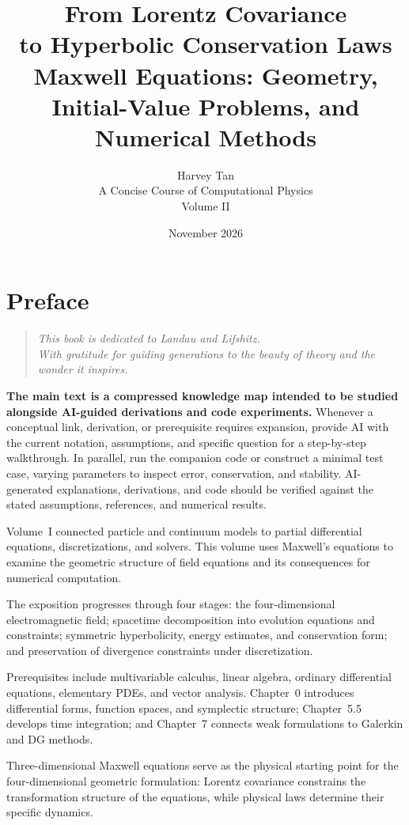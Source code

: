 \documentclass[11pt,openany]{book}
\title{From Lorentz Covariance\\to Hyperbolic Conservation Laws\\[0.6em]\large Maxwell Equations: Geometry, Initial-Value Problems, and Numerical Methods}
\author{Harvey Tan\\[0.6em]\large A Concise Course of Computational Physics\\Volume II}
\date{November 2026}
\numberwithin{equation}{chapter}
\theoremstyle{definition}
\theoremstyle{remark}
\begin{document}
\frontmatter
\maketitle
\chapter*{Preface}
\begin{quote}
\itshape
This book is dedicated to Landau and Lifshitz.\\
With gratitude for guiding generations to the beauty of theory and the wonder it inspires.
\end{quote}
\begin{tcolorbox}[colback=red!3,colframe=red!65!black,title={Study Guide: AI Explanations and Code Experiments},fonttitle=\bfseries,boxrule=0.8pt,arc=1mm,breakable]
\textbf{The main text is a compressed knowledge map intended to be studied alongside AI-guided derivations and code experiments.}
Whenever a conceptual link, derivation, or prerequisite requires expansion,
provide AI with the current notation, assumptions, and specific question for a step-by-step walkthrough.
In parallel, run the companion code or construct a minimal test case, varying parameters to inspect error, conservation, and stability.
AI-generated explanations, derivations, and code should be verified against the stated assumptions, references, and numerical results.
\end{tcolorbox}
Volume~I connected particle and continuum models to partial differential equations, discretizations, and solvers. This volume uses Maxwell's equations to examine the geometric structure of field equations and its consequences for numerical computation.

The exposition progresses through four stages: the four-dimensional electromagnetic field; spacetime decomposition into evolution equations and constraints; symmetric hyperbolicity, energy estimates, and conservation form; and preservation of divergence constraints under discretization.

Prerequisites include multivariable calculus, linear algebra, ordinary differential equations, elementary PDEs, and vector analysis. Chapter~0 introduces differential forms, function spaces, and symplectic structure; Chapter~5.5 develops time integration; and Chapter~7 connects weak formulations to Galerkin and DG methods.

Three-dimensional Maxwell equations serve as the physical starting point for the four-dimensional geometric formulation: Lorentz covariance constrains the transformation structure of the equations, while physical laws determine their specific dynamics.
\end{document}
